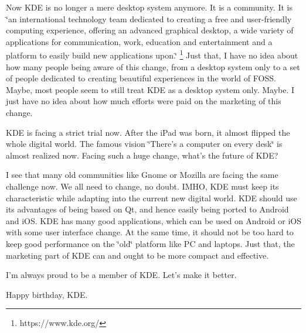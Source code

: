 Now KDE is no longer a mere desktop system anymore. It is a community.
It is \char`\"{}an international technology team dedicated to creating
a free and user-friendly computing experience, offering an advanced
graphical desktop, a wide variety of applications for communication,
work, education and entertainment and a platform to easily build new
applications upon.\char`\"{}%
\footnote{https://www.kde.org/%
} Just that, I have no idea about how many people being aware of this
change, from a desktop system only to a set of people dedicated to
creating beautiful experiences in the world of FOSS. Maybe, most people
seem to still treat KDE as a desktop system only. Maybe. I just have
no idea about how much efforts were paid on the marketing of this
change. 

KDE is facing a strict trial now. After the iPad was born, it almost
flipped the whole digital world. The famous vision \char`\"{}There's
a computer on every desk\char`\"{} is almost realized now. Facing
such a huge change, what's the future of KDE?

I see that many old communities like Gnome or Mozilla are facing the
same challenge now. We all need to change, no doubt. IMHO, KDE must
keep its characteristic while adapting into the current new digital
world. KDE should use its advantages of being based on Qt, and hence
easily being ported to Android and iOS. KDE has many good applications,
which can be used on Android or iOS with some user interface change.
At the same time, it should not be too hard to keep good performance
on the \char`\"{}old\char`\"{} platform like PC and laptops. Just
that, the marketing part of KDE can and ought to be more compact and
effective.

I'm always proud to be a member of KDE. Let's make it better.

Happy birthday, KDE.